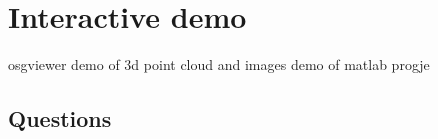 \documentclass{beamer}
\begin{document}
%
%
%
%
%
%









\section{Interactive demo}
	osgviewer demo of 3d point cloud and images
	demo of matlab progje


\subsection{Questions}
\end{document}
